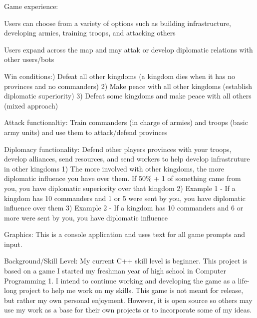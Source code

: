 Game experience:\+
\begin{DoxyItemize}
\item Users can choose from a variety of options such as building infrastructure, developing armies, training troops, and attacking others
\item Users expand across the map and may attak or develop diplomatic relations with other users/\+bots
\item Win conditions:) Defeat all other kingdoms (a kingdom dies when it has no provinces and no commanders) 2) Make peace with all other kingdoms (establish diplomatic superiority) 3) Defeat some kingdoms and make peace with all others (mixed approach)
\item Attack functionaltiy:\+ Train commanders (in charge of armies) and troops (basic army units) and use them to attack/\+defend provinces
\item Diplomacy functionality:\+ Defend other players\textquotesingle{} provinces with your troops, develop alliances, send resources, and send workers to help develop infrastruture in other kingdoms 1) The more involved with other kingdoms, the more diplomatic influence you have over them. If 50\% + 1 of something came from you, you have diplomatic superiority over that kingdom 2) Example 1 -\/ If a kingdom has 10 commanders and 1 or 5 were sent by you, you have diplomatic influence over them 3) Example 2 -\/ If a kingdom has 10 commanders and 6 or more were sent by you, you have diplomatic influence
\end{DoxyItemize}

Graphics:\+ This is a console application and uses text for all game prompts and input.

Background/\+\+Skill Level:\+ My current C++ skill level is beginner. This project is based on a game I started my freshman year of high school in Computer Programming 1. I intend to continue working and developing the game as a life-\/long project to help me work on my skills. This game is not meant for release, but rather my own personal enjoyment. However, it is open source so others may use my work as a base for their own projects or to incorporate some of my ideas. 